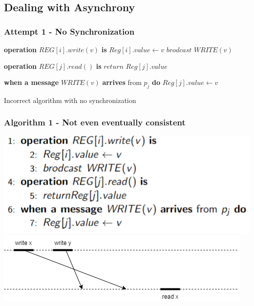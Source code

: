 \subsection{Dealing with Asynchrony}

\begin{frame}[fragile]
    \frametitle{Attempt 1 - No Synchronization}
    \begin{algorithm}[H]
        \begin{algorithmic}[0]
            \STATE \textbf{operation} $REG[i].write(v)$ \textbf{is}
            \bindent
                \STATE $Reg[i].value \leftarrow v$
                \STATE $brodcast$ $WRITE(v)$
            \eindent

            \STATE \textbf{operation} $REG[j].read()$ \textbf{is}
            \bindent
                \STATE $return$ $Reg[j].value$
            \eindent
            
            \STATE \textbf{when a message} $WRITE(v)$ \textbf{arrives} from $p_j$ \textbf{do}
            \bindent
                \STATE $Reg[j].value \leftarrow v$
            \eindent

        \end{algorithmic}
        \caption{Incorrect algorithm with no synchronization}
        \label{alg:seq}
    \end{algorithm}
\end{frame}

\begin{frame}
    \frametitle{Algorithm 1 - Not even eventually consistent}
    \begin{center}
        \includegraphics[scale=.7]{alg1_src.png}
        \includegraphics[scale=.5]{alg1_incorrectness.png}
    \end{center}
\end{frame}

